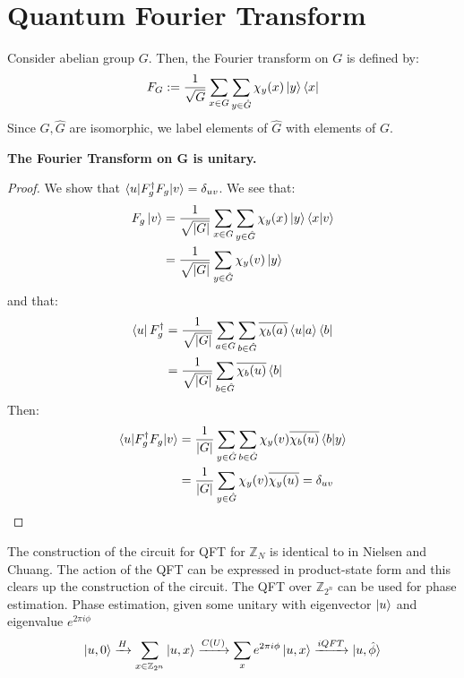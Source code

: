\documentclass{article}
\begin{document}
\section{Quantum Fourier Transform}
Consider abelian group $G$. Then, the Fourier transform on $G$ is defined by:
$$F_G := \frac{1}{\sqrt{G}} \sum_{x \in G} \sum_{y \in \hat{G}} \chi_y(x) \ket{y}\bra{x}$$
Since $G, \hat{G}$ are isomorphic, we label elements of $\hat{G}$ with elements of $G$. 
\begin{tcolorbox}\textbf{The Fourier Transform on G is unitary.}
	\begin{proof}
		We show that $\braket{u|F^\dag_g F_g|v} = \delta_{uv}$.
		We see that:
		\begin{align*}
			F_g\ket{v} &= \frac{1}{\sqrt{|G|}} \sum_{x \in G} \sum_{y \in \hat{G}} \chi_y(x)\ket{y} \braket{x|v}\\
				   &= \frac{1}{\sqrt{|G|}} \sum_{y \in \hat{G}} \chi_y(v) \ket{y}
		\end{align*}
		and that:
		\begin{align*}
			\bra{u}F^\dag_g &= \frac{1}{\sqrt{|G|}} \sum_{a \in G} \sum_{b \in \hat{G}} \overline{\chi_b(a)} \braket{u|a}\bra{b}\\
					&= \frac{1}{\sqrt{|G|}} \sum_{b \in \hat{G}} \overline{\chi_b(u)} \bra{b}
		\end{align*}
		Then:
		\begin{align*}
			\braket{u|F^\dag_g F_g|v} &= \frac{1}{|G|} \sum_{y\in\hat{G}}\sum_{b \in \hat{G}}\chi_y(v) \overline{\chi_b(u)} \braket{b|y}\\
						  &= \frac{1}{|G|} \sum_{y \in \hat{G}} \chi_y(v)\overline{\chi_y (u)} = \delta_{uv}
	\end{align*}
	\end{proof}
\end{tcolorbox}
The construction of the circuit for QFT for $\mathbb{Z}_N$ is identical to in Nielsen and Chuang. The action of the QFT can be expressed in product-state form and this clears up the construction of the circuit. 
The QFT over $\mathbb{Z}_{2^n}$ can be used for phase estimation. Phase estimation, given some unitary with eigenvector $\ket{u}$ and eigenvalue $e^{2 \pi i \phi}$
$$\ket{u,0} \xrightarrow[]{H} \sum_{x \in \mathbb{Z}_{2^n}}\ket{u, x} \xrightarrow[]{C(U)} \sum_{x} e^{2\pi i \phi} \ket{u,x} \xrightarrow[]{iQFT} \ket{u, \hat{\phi}}$$
\end{document}
